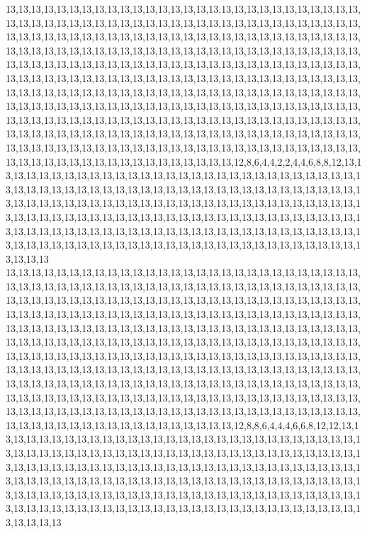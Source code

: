 13,13,13,13,13,13,13,13,13,13,13,13,13,13,13,13,13,13,13,13,13,13,13,13,13,13,13,13,13,13,13,13,13,13,13,13,13,13,13,13,13,13,13,13,13,13,13,13,13,13,13,13,13,13,13,13,13,13,13,13,13,13,13,13,13,13,13,13,13,13,13,13,13,13,13,13,13,13,13,13,13,13,13,13,13,13,13,13,13,13,13,13,13,13,13,13,13,13,13,13,13,13,13,13,13,13,13,13,13,13,13,13,13,13,13,13,13,13,13,13,13,13,13,13,13,13,13,13,13,13,13,13,13,13,13,13,13,13,13,13,13,13,13,13,13,13,13,13,13,13,13,13,13,13,13,13,13,13,13,13,13,13,13,13,13,13,13,13,13,13,13,13,13,13,13,13,13,13,13,13,13,13,13,13,13,13,13,13,13,13,13,13,13,13,13,13,13,13,13,13,13,13,13,13,13,13,13,13,13,13,13,13,13,13,13,13,13,13,13,13,13,13,13,13,13,13,13,13,13,13,13,13,13,13,13,13,13,13,13,13,13,13,13,13,13,13,13,13,13,13,13,13,13,13,13,13,13,13,13,13,13,13,13,13,13,13,13,13,13,13,13,13,13,13,13,13,13,13,13,13,13,13,13,13,13,13,13,13,13,13,13,13,13,13,13,13,13,13,13,13,13,13,13,13,13,13,13,13,13,13,13,13,13,13,13,13,13,13,13,13,13,13,13,13,13,13,12,8,6,4,4,2,2,4,4,6,8,8,12,13,13,13,13,13,13,13,13,13,13,13,13,13,13,13,13,13,13,13,13,13,13,13,13,13,13,13,13,13,13,13,13,13,13,13,13,13,13,13,13,13,13,13,13,13,13,13,13,13,13,13,13,13,13,13,13,13,13,13,13,13,13,13,13,13,13,13,13,13,13,13,13,13,13,13,13,13,13,13,13,13,13,13,13,13,13,13,13,13,13,13,13,13,13,13,13,13,13,13,13,13,13,13,13,13,13,13,13,13,13,13,13,13,13,13,13,13,13,13,13,13,13,13,13,13,13,13,13,13,13,13,13,13,13,13,13,13,13,13,13,13,13,13,13,13,13,13,13,13,13,13,13,13,13,13,13,13,13,13,13,13,13,13,13,13,13,13,13,13,13,13,13,13
13,13,13,13,13,13,13,13,13,13,13,13,13,13,13,13,13,13,13,13,13,13,13,13,13,13,13,13,13,13,13,13,13,13,13,13,13,13,13,13,13,13,13,13,13,13,13,13,13,13,13,13,13,13,13,13,13,13,13,13,13,13,13,13,13,13,13,13,13,13,13,13,13,13,13,13,13,13,13,13,13,13,13,13,13,13,13,13,13,13,13,13,13,13,13,13,13,13,13,13,13,13,13,13,13,13,13,13,13,13,13,13,13,13,13,13,13,13,13,13,13,13,13,13,13,13,13,13,13,13,13,13,13,13,13,13,13,13,13,13,13,13,13,13,13,13,13,13,13,13,13,13,13,13,13,13,13,13,13,13,13,13,13,13,13,13,13,13,13,13,13,13,13,13,13,13,13,13,13,13,13,13,13,13,13,13,13,13,13,13,13,13,13,13,13,13,13,13,13,13,13,13,13,13,13,13,13,13,13,13,13,13,13,13,13,13,13,13,13,13,13,13,13,13,13,13,13,13,13,13,13,13,13,13,13,13,13,13,13,13,13,13,13,13,13,13,13,13,13,13,13,13,13,13,13,13,13,13,13,13,13,13,13,13,13,13,13,13,13,13,13,13,13,13,13,13,13,13,13,13,13,13,13,13,13,13,13,13,13,13,13,13,13,13,13,13,13,13,13,13,13,13,13,13,13,13,13,13,13,13,13,13,13,13,13,13,13,13,13,13,13,13,13,13,13,13,12,8,8,6,4,4,4,6,6,8,12,12,13,13,13,13,13,13,13,13,13,13,13,13,13,13,13,13,13,13,13,13,13,13,13,13,13,13,13,13,13,13,13,13,13,13,13,13,13,13,13,13,13,13,13,13,13,13,13,13,13,13,13,13,13,13,13,13,13,13,13,13,13,13,13,13,13,13,13,13,13,13,13,13,13,13,13,13,13,13,13,13,13,13,13,13,13,13,13,13,13,13,13,13,13,13,13,13,13,13,13,13,13,13,13,13,13,13,13,13,13,13,13,13,13,13,13,13,13,13,13,13,13,13,13,13,13,13,13,13,13,13,13,13,13,13,13,13,13,13,13,13,13,13,13,13,13,13,13,13,13,13,13,13,13,13,13,13,13,13,13,13,13,13,13,13,13,13,13,13,13,13,13,13,13,13
